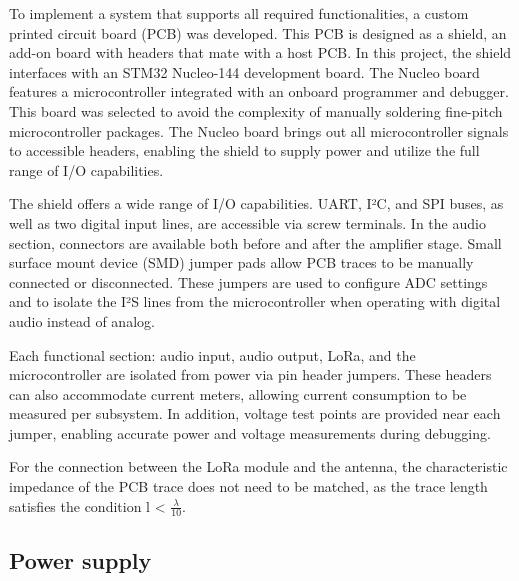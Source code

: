 

To implement a system that supports all required functionalities, a custom printed circuit board (PCB) was developed.
This PCB is designed as a shield, an add-on board with headers that mate with a host PCB.
In this project, the shield interfaces with an STM32 Nucleo-144 development board.
The Nucleo board features a microcontroller integrated with an onboard programmer and debugger.
This board was selected to avoid the complexity of manually soldering fine-pitch microcontroller packages.
The Nucleo board brings out all microcontroller signals to accessible headers, enabling the shield to supply power and utilize the full range of I/O capabilities.

The shield offers a wide range of I/O capabilities.
UART, I²C, and SPI buses, as well as two digital input lines, are accessible via screw terminals.
In the audio section, connectors are available both before and after the amplifier stage.
Small surface mount device (SMD) jumper pads allow PCB traces to be manually connected or disconnected. 
These jumpers are used to configure ADC settings and to isolate the I²S lines from the microcontroller when operating with digital audio instead of analog.

Each functional section: audio input, audio output, LoRa, and the microcontroller are isolated from power via pin header jumpers.
These headers can also accommodate current meters, allowing current consumption to be measured per subsystem.
In addition, voltage test points are provided near each jumper, enabling accurate power and voltage measurements during debugging.

For the connection between the LoRa module and the antenna, 
the characteristic impedance of the PCB trace does not need to be matched,
 as the trace length satisfies the condition l < $\frac{\lambda}{10}$.

\subsection{Power supply}

